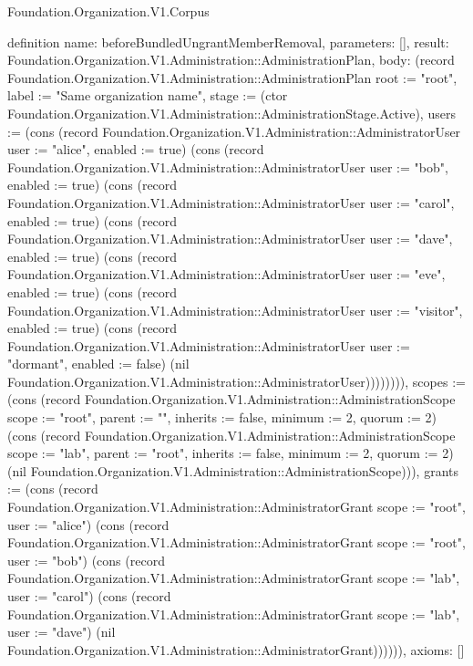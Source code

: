 \begin{lexlean}{Foundation.Organization.V1.Corpus}
\begin{semanticmodule}
definition{
  name: beforeBundledUngrantMemberRemoval,
  parameters: [],
  result: Foundation.Organization.V1.Administration::AdministrationPlan,
  body: (record Foundation.Organization.V1.Administration::AdministrationPlan {root := "root", label := "Same organization name", stage := (ctor Foundation.Organization.V1.Administration::AdministrationStage.Active), users := (cons (record Foundation.Organization.V1.Administration::AdministratorUser {user := "alice", enabled := true}) (cons (record Foundation.Organization.V1.Administration::AdministratorUser {user := "bob", enabled := true}) (cons (record Foundation.Organization.V1.Administration::AdministratorUser {user := "carol", enabled := true}) (cons (record Foundation.Organization.V1.Administration::AdministratorUser {user := "dave", enabled := true}) (cons (record Foundation.Organization.V1.Administration::AdministratorUser {user := "eve", enabled := true}) (cons (record Foundation.Organization.V1.Administration::AdministratorUser {user := "visitor", enabled := true}) (cons (record Foundation.Organization.V1.Administration::AdministratorUser {user := "dormant", enabled := false}) (nil Foundation.Organization.V1.Administration::AdministratorUser)))))))), scopes := (cons (record Foundation.Organization.V1.Administration::AdministrationScope {scope := "root", parent := "", inherits := false, minimum := 2, quorum := 2}) (cons (record Foundation.Organization.V1.Administration::AdministrationScope {scope := "lab", parent := "root", inherits := false, minimum := 2, quorum := 2}) (nil Foundation.Organization.V1.Administration::AdministrationScope))), grants := (cons (record Foundation.Organization.V1.Administration::AdministratorGrant {scope := "root", user := "alice"}) (cons (record Foundation.Organization.V1.Administration::AdministratorGrant {scope := "root", user := "bob"}) (cons (record Foundation.Organization.V1.Administration::AdministratorGrant {scope := "lab", user := "carol"}) (cons (record Foundation.Organization.V1.Administration::AdministratorGrant {scope := "lab", user := "dave"}) (nil Foundation.Organization.V1.Administration::AdministratorGrant)))))}),
  axioms: []
}


\end{semanticmodule}
\end{lexlean}
